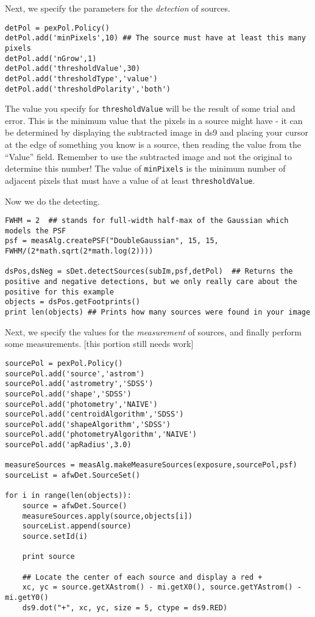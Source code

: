 Next, we specify the parameters for the \textit{detection} of sources.
\begin{verbatim}
detPol = pexPol.Policy()
detPol.add('minPixels',10) ## The source must have at least this many pixels
detPol.add('nGrow',1)
detPol.add('thresholdValue',30)
detPol.add('thresholdType','value')
detPol.add('thresholdPolarity','both')
\end{verbatim}

The value you specify for \texttt{thresholdValue} will be the result of some trial and error. This is the minimum value that the pixels in a source might have - it can be determined by displaying the subtracted image in ds9 and placing your cursor at the edge of something you know is a source, then reading the value from the ``Value'' field.  Remember to use the subtracted image and not the original to determine this number!  The value of \texttt{minPixels} is the minimum number of adjacent pixels that must have a value of at least \texttt{thresholdValue}.

Now we do the detecting.

\begin{verbatim}
FWHM = 2  ## stands for full-width half-max of the Gaussian which models the PSF
psf = measAlg.createPSF("DoubleGaussian", 15, 15, FWHM/(2*math.sqrt(2*math.log(2))))

dsPos,dsNeg = sDet.detectSources(subIm,psf,detPol)  ## Returns the positive and negative detections, but we only really care about the positive for this example
objects = dsPos.getFootprints()
print len(objects) ## Prints how many sources were found in your image
\end{verbatim}

Next, we specify the values for the \textit{measurement} of sources, and finally perform some measurements. [this portion still needs work]
\begin{verbatim}
sourcePol = pexPol.Policy()
sourcePol.add('source','astrom')
sourcePol.add('astrometry','SDSS')
sourcePol.add('shape','SDSS')
sourcePol.add('photometry','NAIVE')
sourcePol.add('centroidAlgorithm','SDSS')
sourcePol.add('shapeAlgorithm','SDSS')
sourcePol.add('photometryAlgorithm','NAIVE')
sourcePol.add('apRadius',3.0)

measureSources = measAlg.makeMeasureSources(exposure,sourcePol,psf)
sourceList = afwDet.SourceSet()

for i in range(len(objects)):
    source = afwDet.Source()
    measureSources.apply(source,objects[i])
    sourceList.append(source)
    source.setId(i)
       
    print source

    ## Locate the center of each source and display a red +
    xc, yc = source.getXAstrom() - mi.getX0(), source.getYAstrom() - mi.getY0()
    ds9.dot("+", xc, yc, size = 5, ctype = ds9.RED)

\end{verbatim}
